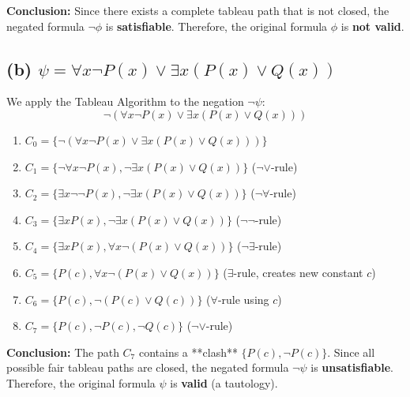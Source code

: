 \documentclass[12pt]{article}
\begin{document}
\textbf{Conclusion:} Since there exists a complete tableau path that is not closed, the negated formula $\neg\phi$ is \textbf{satisfiable}. Therefore, the original formula $\phi$ is \textbf{not valid}.

\subsection*{(b) $\psi = \forall x \neg P(x) \vee \exists x( P(x) \vee Q(x))$}

We apply the Tableau Algorithm to the negation $\neg\psi$:
$$\neg (\forall x \neg P(x) \vee \exists x( P(x) \vee Q(x)))$$

\begin{tcolorbox}[title=Tableau Path for $\neg\psi$]
\begin{enumerate}
    \item $C_0 = \{ \neg (\forall x \neg P(x) \vee \exists x( P(x) \vee Q(x))) \}$
    \item $C_1 = \{ \neg \forall x \neg P(x), \neg \exists x (P(x) \vee Q(x)) \}$ \hfill ($\neg\vee$-rule)
    \item $C_2 = \{ \exists x \neg \neg P(x), \neg \exists x (P(x) \vee Q(x)) \}$ \hfill ($\neg\forall$-rule)
    \item $C_3 = \{ \exists x P(x), \neg \exists x (P(x) \vee Q(x)) \}$ \hfill ($\neg\neg$-rule)
    \item $C_4 = \{ \exists x P(x), \forall x \neg (P(x) \vee Q(x)) \}$ \hfill ($\neg\exists$-rule)
    \item $C_5 = \{ P(c), \forall x \neg (P(x) \vee Q(x)) \}$ \hfill ($\exists$-rule, creates new constant $c$)
    \item $C_6 = \{ P(c), \neg (P(c) \vee Q(c)) \}$ \hfill ($\forall$-rule using $c$)
    \item $C_7 = \{ P(c), \neg P(c), \neg Q(c) \}$ \hfill ($\neg\vee$-rule)
\end{enumerate}
\end{tcolorbox}

\textbf{Conclusion:} The path $C_7$ contains a **clash** $\{P(c), \neg P(c)\}$. Since all possible fair tableau paths are closed, the negated formula $\neg\psi$ is \textbf{unsatisfiable}. Therefore, the original formula $\psi$ is \textbf{valid} (a tautology).
\end{document}
